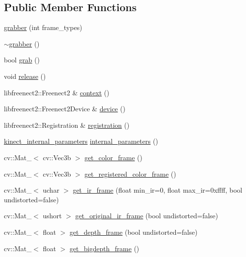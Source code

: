 \subsection*{Public Member Functions}
\begin{DoxyCompactItemize}
\item 
\hyperlink{classtlz_1_1grabber_a0f65e0b0cec49add57f0a8b1621a0432}{grabber} (int frame\+\_\+types)
\item 
\hyperlink{classtlz_1_1grabber_a8812abd452276a357fce55cff4716ddf}{$\sim$grabber} ()
\item 
bool \hyperlink{classtlz_1_1grabber_a14d256bd7ef0af5be70f2bd7713a7e54}{grab} ()
\item 
void \hyperlink{classtlz_1_1grabber_a412843d3f5dbbcb179e5ae4709577b91}{release} ()
\item 
libfreenect2\+::\+Freenect2 \& \hyperlink{classtlz_1_1grabber_a4e74eda0f21e088b4e41c7008661dba8}{context} ()
\item 
libfreenect2\+::\+Freenect2\+Device \& \hyperlink{classtlz_1_1grabber_ab490d6360e17972b0ef7248602c52f04}{device} ()
\item 
libfreenect2\+::\+Registration \& \hyperlink{classtlz_1_1grabber_af2f88b4d5534f61eca78cfbad2b02dd7}{registration} ()
\item 
\hyperlink{structtlz_1_1kinect__internal__parameters}{kinect\+\_\+internal\+\_\+parameters} \hyperlink{classtlz_1_1grabber_a22479c42efb500428a6178391d3e9611}{internal\+\_\+parameters} ()
\item 
cv\+::\+Mat\+\_\+$<$ cv\+::\+Vec3b $>$ \hyperlink{classtlz_1_1grabber_a64e9af7d0c0e982539c7465f4c8c2755}{get\+\_\+color\+\_\+frame} ()
\item 
cv\+::\+Mat\+\_\+$<$ cv\+::\+Vec3b $>$ \hyperlink{classtlz_1_1grabber_a5b829552bf72ef9996dcb7d3a40f42d2}{get\+\_\+registered\+\_\+color\+\_\+frame} ()
\item 
cv\+::\+Mat\+\_\+$<$ uchar $>$ \hyperlink{classtlz_1_1grabber_ab0a7ab9197c8d2676a072c3f9eadd96d}{get\+\_\+ir\+\_\+frame} (float min\+\_\+ir=0, float max\+\_\+ir=0xffff, bool undistorted=false)
\item 
cv\+::\+Mat\+\_\+$<$ ushort $>$ \hyperlink{classtlz_1_1grabber_ac0436df6301b3b5773d06c499d946fbb}{get\+\_\+original\+\_\+ir\+\_\+frame} (bool undistorted=false)
\item 
cv\+::\+Mat\+\_\+$<$ float $>$ \hyperlink{classtlz_1_1grabber_a22caa426aef0275c5cdf9bfebe352940}{get\+\_\+depth\+\_\+frame} (bool undistorted=false)
\item 
cv\+::\+Mat\+\_\+$<$ float $>$ \hyperlink{classtlz_1_1grabber_a0b1242b05d42416c5558bf31e5494dc2}{get\+\_\+bigdepth\+\_\+frame} ()
\end{DoxyCompactItemize}


